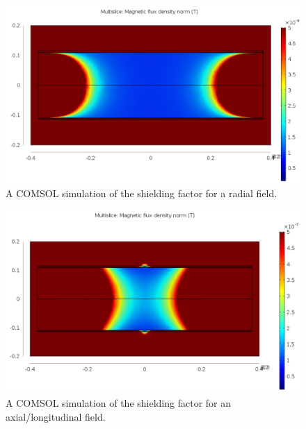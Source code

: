 \documentclass{TheMartianReport}
\begin{document}
\begin{figure}[h]
	\centering
	\includegraphics[scale=0.35]{radial_sim}
	\caption{A COMSOL simulation of the shielding factor for a radial field.}
	\label{fig:RadialSim}
\end{figure}

\begin{figure}[h]
	\centering
	\includegraphics[scale=0.5]{axial_sim}
	\caption{A COMSOL simulation of the shielding factor for an axial/longitudinal field.}
	\label{fig:AxialSim}
\end{figure}
\end{document}
